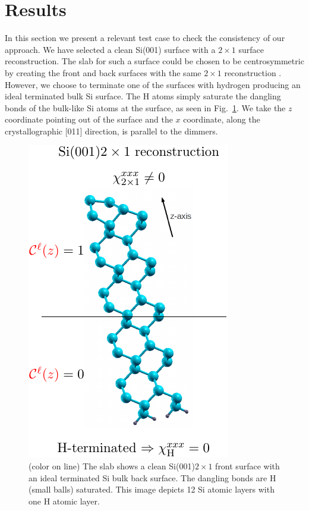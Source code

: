 \documentclass[floatfix,prb,aps,superscriptaddress,11pt,preprint,letterpaper]{revtex4}
\def\chon{black}
\begin{document}
\section{Results}\label{results}

In this section we present a 
{\color{\chon} relevant test case} to check the
consistency of {\color{\chon} our approach. We have selected}
a clean Si(001) surface with a $2\times 1$ surface reconstruction.
The slab for such a surface could be chosen to be centrosymmetric 
by {\color{\chon} creating} the front {\color{\chon} and back} 
surfaces with the same $2\times 1$
reconstruction{\color{\chon} . However, we choose to} terminate one 
of the surfaces with hydrogen {\color{\chon} producing an ideal  
terminated} bulk Si surface. {\color{\chon} The} H atoms simply saturate the 
dangling bonds of the bulk-like Si atoms at the surface, as seen in 
Fig.~\ref{si2x1}.
We take the $z$ coordinate pointing out of the surface and the $x$
coordinate, along the crystallographic [011] direction, is parallel to the dimmers. 
\begin{figure}
\centering 
\includegraphics[scale=.8]{images/si2x1-crop}
\caption{(color on line) The slab shows a 
    {\color{\chon} clean Si(001)$2\times 1$ front surface 
    with an ideal terminated Si bulk back surface. The}
    dangling bonds are H (small balls) saturated. 
    This {\color{\chon} image depicts} 12 Si atomic layers
    {\color{\chon} with one} H atomic layer. 
\label{si2x1}} 
\end{figure} 
\end{document}
